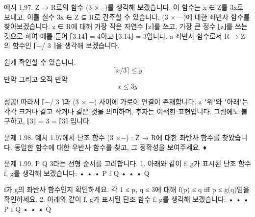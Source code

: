 \documentclass[11pt, a4paper, twoside, openany]{book}
\begin{document}
\par\medskip
예시 1.97.  Z → R\hspace{0pt}로의 함수 (3 ×−)를 생각해 보겠습니다. 이 함수는 x ∈ Z\hspace{0pt}를 3x\hspace{0pt}로 보내고, 이를 실수 3x ∈ Z ⊆ R\hspace{0pt}로 간주할 수 있습니다. (3 × −)에 대한 좌반사 함수를 찾아보겠습니다. z ∈ R\hspace{0pt}에 대해 가장 작은 자연수 ⌈z⌉를 쓰고, 가장 큰 정수 ⌊z⌋를 쓰는 것으로 하여 예를 들어 ⌈3.14⌉ = 4\hspace{0pt}이고 ⌊3.14⌋ = 3\hspace{0pt}입니다. a 좌반사 함수로서 R → Z\hspace{0pt}의 함수인 ⌈−/ 3 ⌉을 생각해 보겠습니다.

\par\medskip
쉽게 확인할 수 있습니다.
$$ \lceil x / 3 \rceil \leq y $$
만약 그리고 오직 만약
$$x \leq 3y$$

\par\medskip
성공! 따라서 ⌈−/ 3 ⌉과 (3 × −) 사이에 가로이 연결이 존재합니다.
a "위"와 "아래"는 각각 크거나 같고 작거나 같은 것을 의미하며, 후자는 어색한 표현입니다. 그럼에도 불구하고, ⌊3⌋ = 3 = ⌈3⌉ 입니다.

\par\medskip
문제 1.98. 예시 1.97\hspace{0pt}에서 단조 함수 (3 ×−) : Z → R\hspace{0pt}에 대한 좌반사 함수를 찾았습니다. 동일한 함수에 대한 우반사 함수를 찾고, 그 정확성을 보여주세요.
♦

\par\medskip
문제 1.99.
P  Q  3\hspace{0pt}라는 선형 순서를 고려합니다.
1. 아래와 같이 f, g\hspace{0pt}가 표시된 단조 함수 f, g\hspace{0pt}를 생각해 보겠습니다:
  •
  •
  •
  P
  f
  Q
  •
  •
  •
  Q

\par\medskip
f\hspace{0pt}가 g\hspace{0pt}의 좌반사 함수인지 확인하세요. 각 1 ≤ p, q ≤ 3\hspace{0pt}에 대해 f(p) ≤ q iﬀ p ≤ g(q)임을 확인하세요.
2. 아래와 같이 f, g\hspace{0pt}가 표시된 단조 함수 f, g\hspace{0pt}를 생각해 보겠습니다:
  •
  •
  •
  P
  f
  Q
  •
  •
  •
  Q
\end{document}
